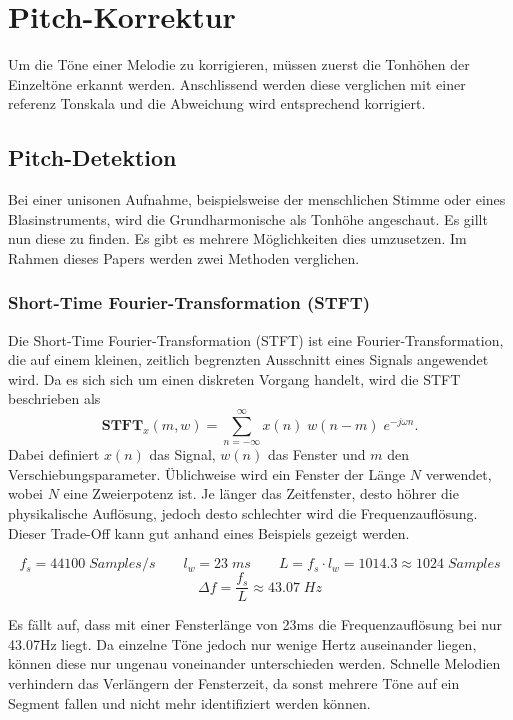 %
%
%
%
\section{Pitch-Korrektur
\label{autotune:section:pitchKorrektur}}
Um die Töne einer Melodie zu korrigieren, müssen zuerst die Tonhöhen der Einzeltöne erkannt werden.
Anschlissend werden diese verglichen mit einer referenz Tonskala und die Abweichung wird entsprechend korrigiert.


\subsection{Pitch-Detektion
\label{autotune:subsection:pitchDetektion}}
Bei einer unisonen Aufnahme, beispielsweise der menschlichen Stimme oder eines Blasinstruments,
wird die Grundharmonische als Tonhöhe angeschaut.
Es gillt nun diese zu finden. Es gibt es mehrere Möglichkeiten dies umzusetzen.
Im Rahmen dieses Papers werden zwei Methoden verglichen.

\subsubsection{Short-Time Fourier-Transformation (STFT)}
Die Short-Time Fourier-Transformation (STFT) ist eine Fourier-Transformation, die auf einem kleinen,
zeitlich begrenzten Ausschnitt eines Signals angewendet wird.
Da es sich sich um einen diskreten Vorgang handelt, wird die STFT beschrieben als
\begin{equation}
    \mathbf{STFT}_x(m, w)
    =
    \sum_{n=-\infty}^{\infty}x(n)\;w(n-m)\;e^{-j\omega n}.
\end{equation}
Dabei definiert $x(n)$ das Signal, $w(n)$ das Fenster und $m$ den Verschiebungsparameter.
Üblichweise wird ein Fenster der Länge $N$ verwendet, wobei $N$ eine Zweierpotenz ist.
Je länger das Zeitfenster, desto höhrer die physikalische Auflösung, jedoch desto schlechter wird die Frequenzauflösung.
Dieser Trade-Off kann gut anhand eines Beispiels gezeigt werden.

\[
    f_s = 44100\;{Samples/s} \quad\quad l_w = 23\;ms \quad\quad L = f_s \cdot l_w = 1014.3 \approx 1024\;{Samples}
\]
\[
    \Delta f = \frac{f_s}{L}\approx 43.07\;Hz
\]

Es fällt auf, dass mit einer Fensterlänge von 23\;ms die Frequenzauflösung bei nur 43.07\;Hz liegt.
Da einzelne Töne jedoch nur wenige Hertz auseinander liegen, können diese nur ungenau voneinander unterschieden werden.
Schnelle Melodien verhindern das Verlängern der Fensterzeit, da sonst mehrere Töne auf ein Segment fallen und nicht mehr identifiziert werden können.

